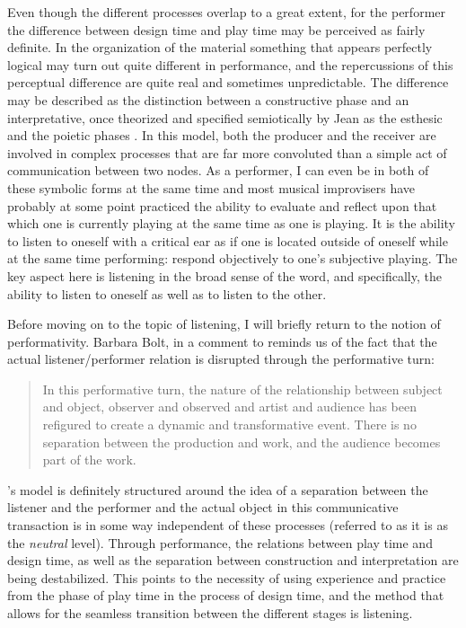 \documentclass[11pt]{article}
\begin{document}
Even though the different processes overlap to a great extent, for the
performer the difference between design time and play time may be
perceived as fairly definite. In the organization of the material
something that appears perfectly logical may turn out quite different
in performance, and the repercussions of this perceptual difference
are quite real and sometimes unpredictable. The difference may be
described as the distinction between a constructive phase and an
interpretative, once theorized and specified semiotically by Jean \citet{molino} as
the esthesic and the poietic phases \citep[See
also][]{frisk-ost06-2}. In this model, both the producer and the
receiver are involved in complex processes that are far more
convoluted than a simple act of communication between two nodes. As a
performer, I can even be in both of these symbolic forms at the same
time and most musical improvisers have probably at some point
practiced the ability to evaluate and reflect upon that which one is
currently playing at the same time as one is playing. It is the
ability to listen to oneself with a critical ear as if one is located
outside of oneself while at the same time performing: respond
objectively to one's subjective playing. The
key aspect here is listening in the broad sense of the word, and
specifically, the ability to listen to oneself as well as to listen to
the other. 

Before moving on to the topic of listening, I will briefly
return to the notion of performativity. Barbara Bolt, in a comment to
\citet{FischerLichte2008} reminds us of the fact that the actual
listener/performer relation is disrupted through the performative
turn:
\begin{quote}
  In this performative turn, the nature of the relationship between
  subject and object, observer and observed and artist and audience
  has been refigured to create a dynamic and transformative
  event. There is no separation between the production and work, and
  the audience becomes part of the work. \citep[][p. 2]{Bolt2009}
\end{quote}
\citeauthor{molino}'s model is definitely structured around the idea
of a separation between the listener and the performer and the actual
object in this communicative transaction is in some way independent of
these processes (referred to as it is as the \emph{neutral}
level). Through performance, the relations between play time and design
time, as well as the separation between
construction and interpretation are being destabilized. This points to the necessity of using experience and practice from the
phase of play time in the process of design time, and the method that
allows for the seamless transition between the different stages is listening.
\end{document}

